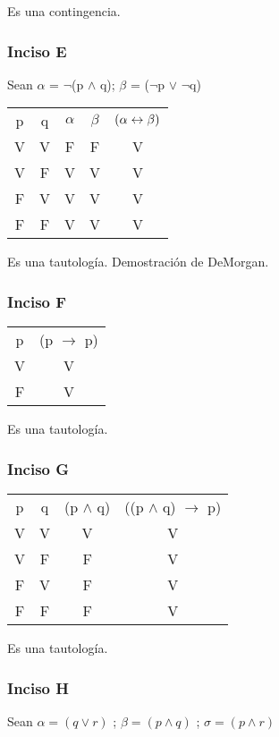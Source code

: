 Es una contingencia.

\subsubsection{Inciso E}

Sean $\alpha$ = $\neg$(p $\wedge$ q); $\beta$ = ($\neg$p $\vee$ $\neg$q)

\begin{tabular}{c|c|c|c|c}
        p & q & $\alpha$ & $\beta$ & $(\alpha \leftrightarrow \beta)$\\
        V & V & F & F & V \\
        V & F & V & V & V \\ 
        F & V & V & V & V \\
        F & F & V & V & V 
\end{tabular}

Es una tautología. Demostración de DeMorgan.

\subsubsection{Inciso F}
\begin{tabular}{c|c}
    p & (p $\rightarrow$ p) \\
    V & V               \\
    F & V
\end{tabular}

Es una tautología.

\subsubsection{Inciso G}
\begin{tabular}{c|c|c|c}
        p & q & (p $\wedge$ q) & ((p $\wedge$ q) $\rightarrow$ p) \\
        V & V & V              & V \\
        V & F & F              & V \\
        F & V & F              & V \\
        F & F & F              & V
\end{tabular}

Es una tautología.

\subsubsection{Inciso H}

Sean $\alpha = (q\vee r)$ ; $\beta = (p \wedge q)$ ; $\sigma = (p \wedge r)$

